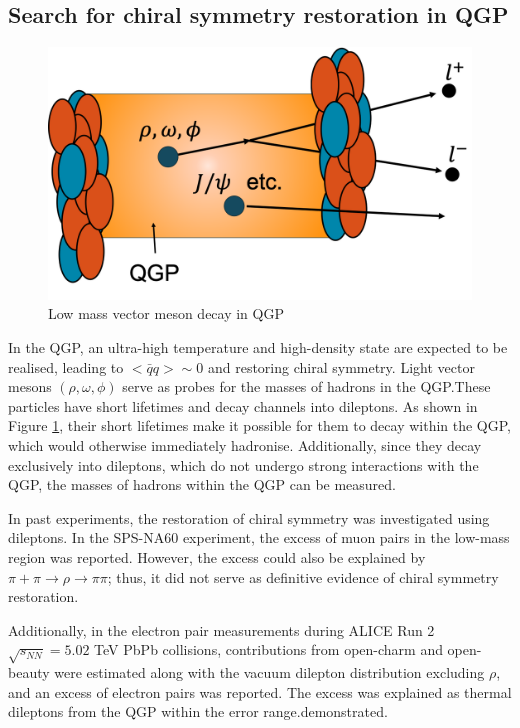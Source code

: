     \subsection{Search for chiral symmetry restoration in QGP}
        \begin{figure}[hbtp]
            \centering
            \includegraphics[keepaspectratio, scale=0.2]{fig/1_7_Search_for_chiral.png}
            \caption{Low mass vector meson decay in QGP}
            \label{Intro:Search_for_CSR:Low_mass_vector_meson_decay_in_QGP}
        \end{figure}     
        In the QGP, an ultra-high temperature and high-density state are expected to be realised, leading to $ < \bar{q}q > \sim 0 $ and restoring chiral symmetry. Light vector mesons $(\rho, \omega, \phi)$ serve as probes for the masses of hadrons in the QGP.\@ These particles have short lifetimes and decay channels into dileptons. As shown in Figure \ref{Intro:Search_for_CSR:Low_mass_vector_meson_decay_in_QGP}, their short lifetimes make it possible for them to decay within the QGP, which would otherwise immediately hadronise. Additionally, since they decay exclusively into dileptons, which do not undergo strong interactions with the QGP, the masses of hadrons within the QGP can be measured.  
        
        In past experiments, the restoration of chiral symmetry was investigated using dileptons. In the SPS-NA60 experiment, the excess of muon pairs in the low-mass region was reported. However, the excess could also be explained by $\pi + \pi \rightarrow \rho \rightarrow \pi \pi$; thus, it did not serve as definitive evidence of chiral symmetry restoration\cite{NA60}.  
        
        Additionally, in the electron pair measurements during ALICE Run 2 $\sqrt{s_{NN}} = 5.02$ TeV PbPb collisions, contributions from open-charm and open-beauty were estimated along with the vacuum dilepton distribution excluding $\rho$, and an excess of electron pairs was reported. The excess was explained as thermal dileptons from the QGP within the error range.demonstrated\cite{ALICE:2023jef}. 
